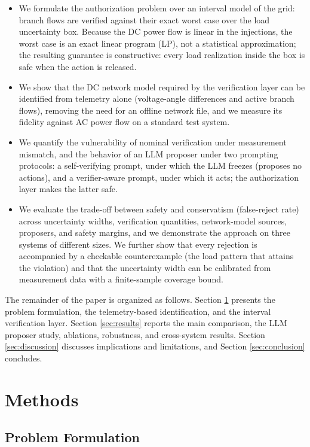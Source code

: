 \documentclass[journal]{IEEEtran}
\begin{document}
\begin{itemize}
\item We formulate the authorization problem over an interval model of the grid:
branch flows are verified against their exact worst case over the load
uncertainty box. Because the DC power flow is linear in the injections, the
worst case is an exact linear program (LP), not a statistical approximation;
the resulting guarantee is constructive: every load realization inside the box
is safe when the action is released.
\item We show that the DC network model required by the verification layer can be
identified from telemetry alone (voltage-angle differences and active branch
flows), removing the need for an offline network file, and we measure its
fidelity against AC power flow on a standard test system.
\item We quantify the vulnerability of nominal verification under measurement
mismatch, and the behavior of an LLM proposer under two prompting protocols:
a self-verifying prompt, under which the LLM freezes (proposes no actions), and
a verifier-aware prompt, under which it acts; the authorization layer makes the
latter safe.
\item We evaluate the trade-off between safety and conservatism (false-reject
rate) across uncertainty widths, verification quantities, network-model
sources, proposers, and safety margins, and we demonstrate the approach on
three systems of different sizes. We further show that every rejection is
accompanied by a checkable counterexample (the load pattern that attains the
violation) and that the uncertainty width can be calibrated from measurement
data with a finite-sample coverage bound.
\end{itemize}

The remainder of the paper is organized as follows. Section \ref{sec:methods}
presents the problem formulation, the telemetry-based identification, and the
interval verification layer. Section \ref{sec:results} reports the main
comparison, the LLM proposer study, ablations, robustness, and cross-system
results. Section \ref{sec:discussion} discusses implications and limitations,
and Section \ref{sec:conclusion} concludes.

\section{Methods}
\label{sec:methods}

\subsection{Problem Formulation}
\label{sec:problem}
\end{document}
